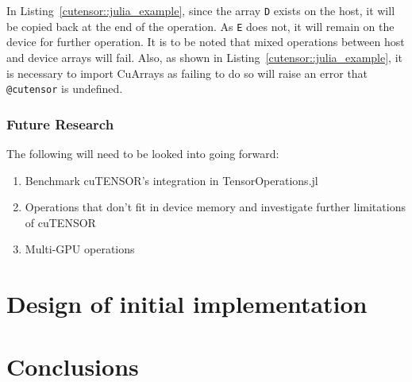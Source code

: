 \documentclass[12pt]{article}
\begin{document}
\noindent In Listing~\ref{cutensor::julia_example}, since the array \texttt{D} exists on the host, it will be copied back at the end of the operation. As \texttt{E} does not, it will remain on the device for further operation. It is to be noted that mixed operations between host and device arrays will fail. Also, as shown in Listing~\ref{cutensor::julia_example}, it is necessary to import CuArrays as failing to do so will raise an error that \texttt{@cutensor} is undefined.

\subsubsection{Future Research} \label{cutensor::futurework}
The following will need to be looked into going forward:

\begin{enumerate}
\item Benchmark cuTENSOR's integration in TensorOperations.jl
\item Operations that don't fit in device memory and investigate further limitations of cuTENSOR
\item Multi-GPU operations
\end{enumerate}

\section{Design of initial implementation}\label{design}

\section{Conclusions}\label{conclusions}



\end{document}
